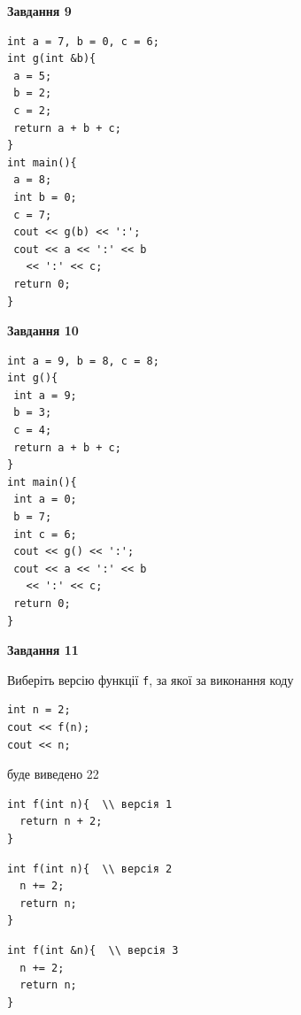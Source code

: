 \documentclass[12pt, ukrainian]{article}
\def\code#1{\Verb!#1!}
\begin{document}
{\begin {large}
\begin{minipage}[t]{11.0cm}
\end{minipage}


\begin{minipage}[t]{7.0cm}

\begin{center}
\textbf{Завдання 9}
\end{center}
\vspace{-8mm}

\begin{verbatim}
int a = 7, b = 0, c = 6;
int g(int &b){
 a = 5;
 b = 2;
 c = 2;
 return a + b + c;
}
int main(){
 a = 8;
 int b = 0;
 c = 7;
 cout << g(b) << ':';
 cout << a << ':' << b 
   << ':' << c;
 return 0;
}
\end{verbatim}



\begin{center}
\textbf{Завдання 10}
\end{center}
\vspace{-8mm}

\begin{verbatim}
int a = 9, b = 8, c = 8;
int g(){
 int a = 9;
 b = 3;
 c = 4;
 return a + b + c;
}
int main(){
 int a = 0;
 b = 7;
 int c = 6;
 cout << g() << ':';
 cout << a << ':' << b 
   << ':' << c;
 return 0;
}
\end{verbatim}

\end{minipage}
\vline \hspace{1mm}
\begin{minipage}[t]{11.0cm}

\begin{center}
\textbf{Завдання 11}
\end{center}
Виберіть версію функції \code{f}, за якої за виконання коду
\begin{verbatim}
int n = 2;
cout << f(n);
cout << n;
\end{verbatim}

буде виведено 22

\begin{verbatim}
int f(int n){  \\ версія 1
  return n + 2;
}
\end{verbatim}

\vspace{-8mm}\begin{verbatim}
int f(int n){  \\ версія 2
  n += 2;
  return n;
}
\end{verbatim}

\vspace{-8mm}\begin{verbatim}
int f(int &n){  \\ версія 3
  n += 2;
  return n;
}
\end{verbatim}


\end{minipage}
\end{large}}
\end{document}
